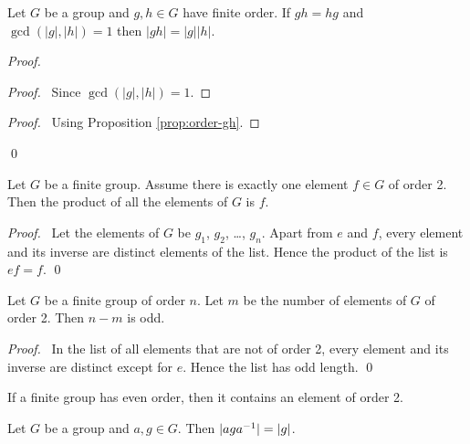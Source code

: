 \begin{prop}
    \label{prop:order-gh-if-gcd-one}
    Let $G$ be a group and $g,h \in G$ have finite order. If $gh=hg$ and $\gcd(|g|,|h|) = 1$ then $|gh| = |g||h|$.
\end{prop}

\begin{proof}
    \pf
    \begin{proof}
        \pf\ Since $\gcd(|g|,|h|) = 1$.
    \end{proof}
    \begin{proof}
        \pf\ Using Proposition \ref{prop:order-gh}.
    \end{proof}
    \qed
\end{proof}

\begin{prop}
    \label{prop:product-of-all-elements}
    Let $G$ be a finite group. Assume there is exactly one element $f \in G$ of order 2. Then the product of all the elements of $G$ is $f$.
\end{prop}

\begin{proof}
    \pf\ Let the elements of $G$ be $g_1$, $g_2$, \ldots, $g_n$. Apart from $e$ and $f$, every element and its inverse are distinct elements of the list. Hence the product of the list is $ef = f$. \qed
\end{proof}

\begin{prop}
    Let $G$ be a finite group of order $n$. Let $m$ be the number of elements of $G$ of order 2. Then $n-m$ is odd.
\end{prop}

\begin{proof}
    \pf\ In the list of all elements that are not of order 2, every element and its inverse are distinct except for $e$. Hence the list has odd length. \qed
\end{proof}

\begin{cor}
    If a finite group has even order, then it contains an element of order 2.
\end{cor}

\begin{prop}
    Let $G$ be a group and $a,g \in G$. Then $|ag{a}^{-1}| = |g|$.
\end{prop}

